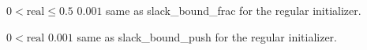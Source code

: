 %
{$0<\textrm{real}\leq0.5$}%
{$0.001$}%
{same as slack\_bound\_frac for the regular initializer.}%
{}

%
{$0<\textrm{real}$}%
{$0.001$}%
{same as slack\_bound\_push for the regular initializer.}%
{}

